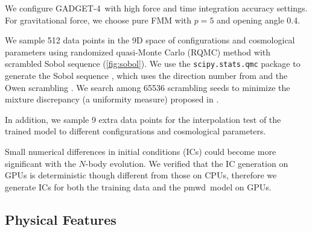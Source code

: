 \documentclass[modern, trackchanges, dvipsnames]{aastex631}
\newcommand{\pmwd}{{\usefont{T1}{nova}{m}{sl}pmwd}}
\newcommand{\GADGET}{{{\fontsize{10pt}{12pt}\selectfont GADGET}-4}}
\begin{document}
We configure \GADGET\ with high force and time integration accuracy
settings.
For gravitational force, we choose pure FMM with $p=5$ and opening angle
0.4.

We sample 512 data points in the 9D space of configurations and
cosmological parameters using randomized quasi-Monte Carlo (RQMC) method
with scrambled Sobol sequence (\autoref{fig:sobol}).
We use the \texttt{scipy.stats.qmc} package \citep{SciPy} to generate
the Sobol sequence \citep{Sobol1967}, which uses the direction number
from \citet{JoeKuo2008} and the Owen scrambling \citep{Owen1998}.
We search among 65536 scrambling seeds to minimize the mixture
discrepancy (a uniformity measure) proposed in \citet{Zhou2013MD}.

In addition, we sample 9 extra data points for the interpolation test of
the trained model to different configurations and cosmological
parameters.

Small numerical differences in initial conditions (ICs) could become
more significant with the $N$-body evolution.
We verified that the IC generation on GPUs is deterministic though
different from those on CPUs, therefore we generate ICs for both the
training data and the \pmwd\ model on GPUs.


\vspace{1em}
\subsection{Physical Features}
\label{sec:features}
\end{document}
